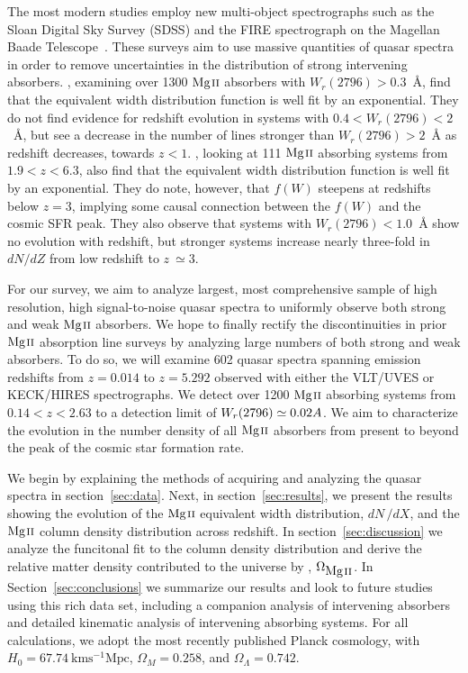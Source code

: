 \documentclass[iop,apj,numberedappendix,appendixfloats,twocolappendix]{emulateapj}
\begin{document}
The most modern studies employ new multi-object spectrographs such as the Sloan Digital Sky Survey (SDSS) and the FIRE spectrograph on the Magellan Baade Telescope~\citep{Nestor2005,Matejek2012}. These surveys aim to use massive quantities of quasar spectra in order to remove uncertainties in the distribution of strong intervening absorbers. \cite{Nestor2005}, examining over 1300 ${\hbox{{\rm Mg}\kern 0.1em{\sc ii}}}$ absorbers with $W_r(2796) > 0.3$~{\AA}, find that the equivalent width distribution function is well fit by an exponential. They do not find evidence for redshift evolution in systems with $0.4 < W_r(2796) < 2$~{\AA}, but see a decrease in the number of lines stronger than $W_r(2796) > 2$~{\AA} as redshift decreases, towards $z < 1$. \cite{Matejek2012}, looking at 111 ${\hbox{{\rm Mg}\kern 0.1em{\sc ii}}}$ absorbing systems from $1.9 < z < 6.3$, also find that the equivalent width distribution function is well fit by an exponential. They do note, however, that $f(W)$ steepens at redshifts below $z = 3$, implying some causal connection between the $f(W)$ and the cosmic SFR peak. They also observe that systems with $W_r(2796) < 1.0$~{\AA} show no evolution with redshift, but stronger systems increase nearly three-fold in $dN\!/dZ$ from low redshift to $z~\simeq 3$. 

For our survey, we aim to analyze largest, most comprehensive sample of high resolution, high signal-to-noise quasar spectra to uniformly observe both strong and weak ${\hbox{{\rm Mg}\kern 0.1em{\sc ii}}}$ absorbers. We hope to finally rectify the discontinuities in prior ${\hbox{{\rm Mg}\kern 0.1em{\sc ii}}}$ absorption line surveys by analyzing large numbers of both strong and weak absorbers. To do so, we will examine 602 quasar spectra spanning emission redshifts from $z = 0.014$ to $z = 5.292$ observed with either the VLT/UVES or KECK/HIRES spectrographs. We detect over 1200 ${\hbox{{\rm Mg}\kern 0.1em{\sc ii}}}$ absorbing systems from $0.14 < z < 2.63$ to a detection limit of $W_r(2796) \simeq 0.02 {\AA}$. We aim to characterize the evolution in the number density of all ${\hbox{{\rm Mg}\kern 0.1em{\sc ii}}}$ absorbers from present to beyond the peak of the cosmic star formation rate.

We begin by explaining the methods of acquiring and analyzing the quasar spectra in section~\ref{sec:data}. Next, in section~\ref{sec:results}, we present the results showing the evolution of the ${\hbox{{\rm Mg}\kern 0.1em{\sc ii}}}$ equivalent width distribution, $dN\,/dX$, and the ${\hbox{{\rm Mg}\kern 0.1em{\sc ii}}}$ column density distribution across redshift. In section~\ref{sec:discussion} we analyze the funcitonal fit to the column density distribution and derive the relative matter density contributed to the universe by {\MgII}, $\Omega_{\hbox{{\rm Mg}\kern 0.1em{\sc ii}}}$. In Section~\ref{sec:conclusions} we summarize our results and look to future studies using this rich data set, including a companion analysis of intervening {\CIV} absorbers and detailed kinematic analysis of intervening absorbing systems. For all calculations, we adopt the most recently published Planck cosmology, with $H_0 = 67.74~\mathrm{km s^{-1} Mpc}$, $\Omega_M = 0.258$, and $\Omega_{\Lambda} = 0.742$.
\end{document}
